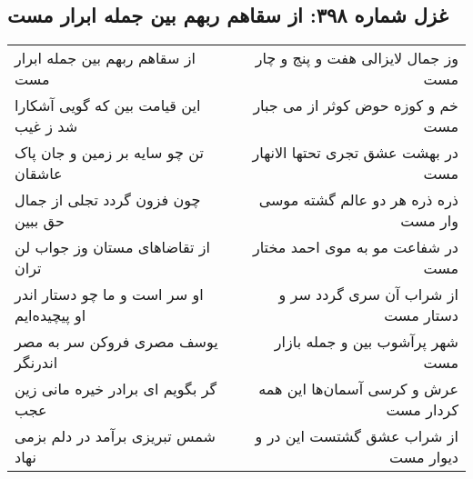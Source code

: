 \begin{center}
\section*{غزل شماره ۳۹۸: از سقاهم ربهم بین جمله ابرار مست}
\label{sec:0398}
\begin{longtable}{l p{0.5cm} r}
از سقاهم ربهم بین جمله ابرار مست
&&
وز جمال لایزالی هفت و پنج و چار مست
\\
این قیامت بین که گویی آشکارا شد ز غیب
&&
خم و کوزه حوض کوثر از می جبار مست
\\
تن چو سایه بر زمین و جان پاک عاشقان
&&
در بهشت عشق تجری تحتها الانهار مست
\\
چون فزون گردد تجلی از جمال حق ببین
&&
ذره ذره هر دو عالم گشته موسی وار مست
\\
از تقاضاهای مستان وز جواب لن تران
&&
در شفاعت مو به موی احمد مختار مست
\\
او سر است و ما چو دستار اندر او پیچیده‌ایم
&&
از شراب آن سری گردد سر و دستار مست
\\
یوسف مصری فروکن سر به مصر اندرنگر
&&
شهر پرآشوب بین و جمله بازار مست
\\
گر بگویم ای برادر خیره مانی زین عجب
&&
عرش و کرسی آسمان‌ها این همه کردار مست
\\
شمس تبریزی برآمد در دلم بزمی نهاد
&&
از شراب عشق گشتست این در و دیوار مست
\\
\end{longtable}
\end{center}
